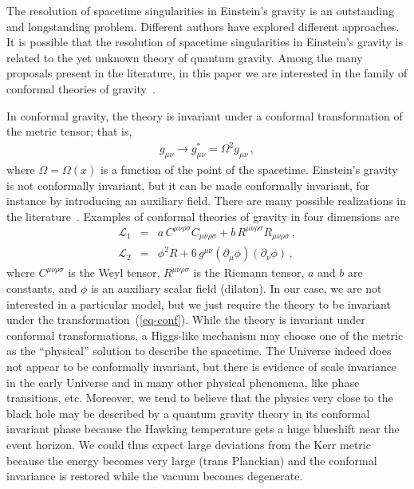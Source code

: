 \documentclass[aps, prd, amsmath, floats, floatfix, twocolumn, nofootinbib, superscriptaddress, showpacs]{revtex4-1}
\newcommand{\be}{\begin{eqnarray}}
\newcommand{\ee}{\end{eqnarray}}
\newcommand{\rar}{\rightarrow}
\begin{document}
The resolution of spacetime singularities in Einstein's gravity is an outstanding and longstanding problem. Different authors have explored different approaches. It is possible that the resolution of spacetime singularities in Einstein's gravity is related to the yet unknown theory of quantum gravity. Among the many proposals present in the literature, in this paper we are interested in the family of conformal theories of gravity~\cite{cg1,cg2,cg3,cg4,cg5}. 


In conformal gravity, the theory is invariant under a conformal transformation of the metric tensor; that is,
\be\label{eq-conf}
g_{\mu\nu} \rar g_{\mu\nu}^* = \Omega^2 g_{\mu\nu} \, ,
\ee
where $\Omega = \Omega (x)$ is a function of the point of the spacetime. Einstein's gravity is not conformally invariant, but it can be made conformally invariant, for instance by introducing an auxiliary field. There are many possible realizations in the literature~\cite{cg1,cg2,cg3,cg4,cg5}. Examples of conformal theories of gravity in four dimensions are
\be
\mathcal{L}_1 &=& a \, C^{\mu\nu\rho\sigma} C_{\mu\nu\rho\sigma} 
+ b \, R^{\mu\nu\rho\sigma} R_{\mu\nu\rho\sigma} \, , \nonumber\\
\mathcal{L}_2 &=& \phi^2 R + 6 \, g^{\mu\nu} (\partial_\mu \phi)( \partial_\nu \phi) \, , \nonumber
\ee
where $C^{\mu\nu\rho\sigma}$ is the Weyl tensor, $R^{\mu\nu\rho\sigma}$ is the Riemann tensor, $a$ and $b$ are constants, and $\phi$ is an auxiliary scalar field (dilaton). In our case, we are not interested in a particular model, but we just require the theory to be invariant under the transformation~(\ref{eq-conf}). While the theory is invariant under conformal transformations, a Higgs-like mechanism may choose one of the metric as the ``physical'' solution to describe the spacetime. The Universe indeed does not appear to be conformally invariant, but there is evidence of scale invariance in the early Universe and in many other physical phenomena, like phase transitions, etc. Moreover, we tend to believe that the physics very close to the black hole may be described by a quantum gravity theory in its conformal invariant phase because the Hawking temperature gets a huge blueshift near the event horizon. We could thus expect large deviations from the Kerr metric because the energy becomes very large (trans Planckian) and the conformal invariance is restored while the vacuum becomes  degenerate.
\end{document}
